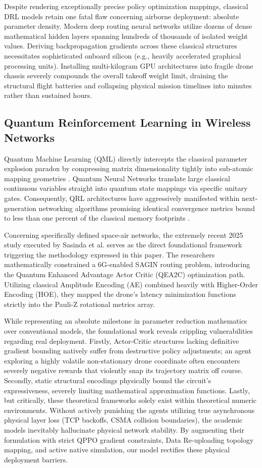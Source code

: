 \documentclass[conference]{IEEEtran}
\begin{document}
Despite rendering exceptionally precise policy optimization mappings, classical DRL models retain one fatal flaw concerning airborne deployment: absolute parameter density. Modern deep routing neural networks utilize dozens of dense mathematical hidden layers spanning hundreds of thousands of isolated weight values. Deriving backpropagation gradients across these classical structures necessitates sophisticated onboard silicon (e.g., heavily accelerated graphical processing units). Installing multi-kilogram GPU architectures into fragile drone chassis severely compounds the overall takeoff weight limit, draining the structural flight batteries and collapsing physical mission timelines into minutes rather than sustained hours. 

\subsection{Quantum Reinforcement Learning in Wireless Networks}
Quantum Machine Learning (QML) directly intercepts the classical parameter explosion paradox by compressing matrix dimensionality tightly into sub-atomic mapping geometries \cite{biamonte2017}. Quantum Neural Networks translate large classical continuous variables straight into quantum state mappings via specific unitary gates. Consequently, QRL architectures have aggressively manifested within next-generation networking algorithms promising identical convergence metrics bound to less than one percent of the classical memory footprints \cite{narottama2021}. 

Concerning specifically defined space-air networks, the extremely recent 2025 study executed by Sasinda et al. \cite{sasinda2025} serves as the direct foundational framework triggering the methodology expressed in this paper. The researchers mathematically constrained a 6G-enabled SAGIN routing problem, introducing the Quantum Enhanced Advantage Actor Critic (QEA2C) optimization path. Utilizing classical Amplitude Encoding (AE) combined heavily with Higher-Order Encoding (HOE), they mapped the drone's latency minimization functions strictly into the Pauli-Z rotational metrics array. 

While representing an absolute milestone in parameter reduction mathematics over conventional models, the foundational work reveals crippling vulnerabilities regarding real deployment. Firstly, Actor-Critic structures lacking definitive gradient bounding natively suffer from destructive policy adjustments; an agent exploring a highly volatile non-stationary drone coordinate often encounters severely negative rewards that violently snap its trajectory matrix off course. Secondly, static structural encodings physically bound the circuit's expressiveness, severely limiting mathematical approximation functions. Lastly, but critically, these theoretical frameworks solely exist within theoretical numeric environments. Without actively punishing the agents utilizing true asynchronous physical layer loss (TCP backoffs, CSMA collision boundaries), the academic models inevitably hallucinate physical network stability. By augmenting their formulation with strict QPPO gradient constraints, Data Re-uploading topology mapping, and active native simulation, our model rectifies these physical deployment barriers.
\end{document}
